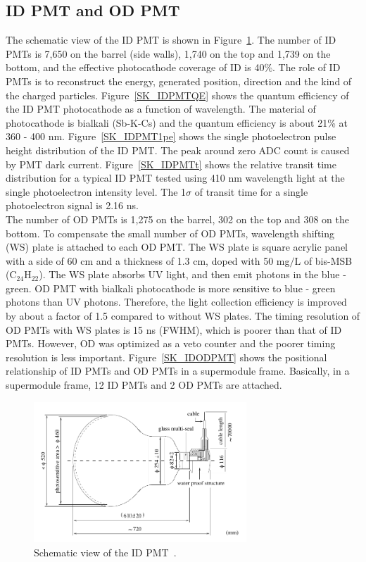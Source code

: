 \subsection{ID PMT and OD PMT}
\vs\hs The schematic view of the ID PMT is shown in Figure~\ref{SK_IDPMT}.
The number of ID PMTs is 7,650 on the barrel (side walls), 1,740 on the top and 1,739 on the bottom, and the effective photocathode coverage of ID is 40\%.
The role of ID PMTs is to reconstruct the energy, generated position, direction and the kind of the charged particles.
Figure~\ref{SK_IDPMTQE} shows the quantum efficiency of the ID PMT photocathode as a function of wavelength.
The material of photocathode is bialkali (Sb-K-Cs) and the quantum efficiency is about 21\% at 360 - 400 nm.
Figure~\ref{SK_IDPMT1pe} shows the single photoelectron pulse height distribution of the ID PMT.
The peak around zero ADC count is caused by PMT dark current.
Figure~\ref{SK_IDPMTt} shows the relative transit time distribution for a typical ID PMT tested using 410 nm wavelength light at the single photoelectron intensity level.
The 1$\sigma$ of transit time for a single photoelectron signal is 2.16 ns.\\
\hs The number of OD PMTs is 1,275 on the barrel, 302 on the top and 308 on the bottom.
To compensate the small number of OD PMTs, wavelength shifting (WS) plate is attached to each OD PMT.
The WS plate is square acrylic panel with a side of 60 cm and a thickness of 1.3 cm, doped with 50 mg$/$L of bis-MSB (C$_{\text{24}}$H$_{\text{22}}$).
The WS plate absorbs UV light, and then emit photons in the blue - green.
OD PMT with bialkali photocathode is more sensitive to blue - green photons than UV photons.
Therefore, the light collection efficiency is improved by about a factor of 1.5 compared to without WS plates.
The timing resolution of OD PMTs with WS plates is 15 ns (FWHM), which is poorer than that of ID PMTs.
However, OD was optimized as a veto counter and the poorer timing resolution is less important.
Figure~\ref{SK_IDODPMT} shows the positional relationship of ID PMTs and OD PMTs in a supermodule frame.
Basically, in a supermodule frame, 12 ID PMTs and 2 OD PMTs are attached.

\begin{figure}[tbp]
	\centering
	\includegraphics[width=8cm]{Figures/SK/IDPMT}
	\caption[Schematic view of the ID PMT]{\label{SK_IDPMT} Schematic view of the ID PMT~\cite{2003Fukuda}.}
\end{figure}


